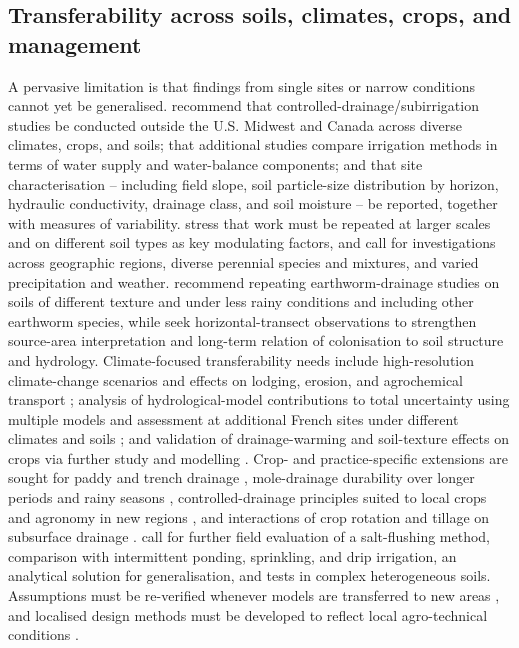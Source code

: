 \subsection{Transferability across soils, climates, crops, and management}

A pervasive limitation is that findings from single sites or narrow conditions
cannot yet be generalised. \textcite{Singh2022b} recommend that controlled-drainage/subirrigation
studies be conducted outside the U.S. Midwest and Canada across diverse climates,
crops, and soils; that additional studies compare irrigation methods in terms of
water supply and water-balance components; and that site characterisation --
including field slope, soil particle-size distribution by horizon, hydraulic
conductivity, drainage class, and soil moisture -- be reported, together with
measures of variability. \textcite{Bilotta2008} stress that work must be repeated
at larger scales and on different soil types as key modulating factors, and
\textcite{Goeken2015} call for investigations across geographic regions, diverse
perennial species and mixtures, and varied precipitation and weather.
\textcite{Nuutinen2001} recommend repeating earthworm-drainage studies on soils of
different texture and under less rainy conditions and including other earthworm
species, while \textcite{Nuutinen2011} seek horizontal-transect observations to
strengthen source-area interpretation and long-term relation of colonisation to
soil structure and hydrology. Climate-focused transferability needs include
high-resolution climate-change scenarios and effects on lodging, erosion, and
agrochemical transport \parencite{Rasmussen2018}; analysis of hydrological-model
contributions to total uncertainty using multiple models and assessment at
additional French sites under different climates and soils \parencite{Jeantet2022};
and validation of drainage-warming and soil-texture effects on crops via further
study and modelling \parencite{Jin2008}. Crop- and practice-specific extensions
are sought for paddy and trench drainage \parencite{Rahimi2024,Jia2023},
mole-drainage durability over longer periods and rainy seasons \parencite{JHA1995},
controlled-drainage principles suited to local crops and agronomy in new regions
\parencite{Sojka2020}, and interactions of crop rotation and tillage on subsurface
drainage \parencite{Ojeda2018}. \textcite{Yu2018} call for further field
evaluation of a salt-flushing method, comparison with intermittent ponding,
sprinkling, and drip irrigation, an analytical solution for generalisation, and
tests in complex heterogeneous soils. Assumptions must be re-verified whenever
models are transferred to new areas \parencite{Kelleners2000,Youssef2006}, and
localised design methods must be developed to reflect local agro-technical
conditions \parencite{Tlapáková2017}.

